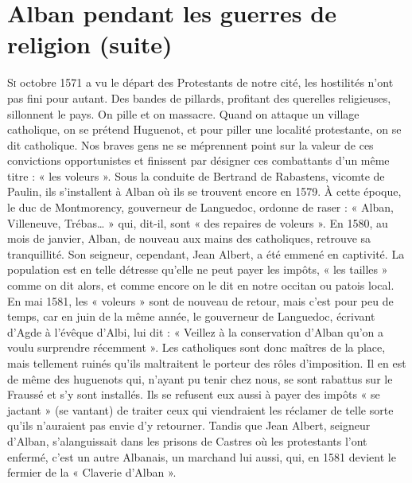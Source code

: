 
\section*{Alban pendant les guerres de religion (suite)}

\lettrine{S}{i} octobre 1571 a vu le départ des Protestants de notre cité, les hostilités n'ont pas fini pour autant. Des bandes de pillards, profitant des querelles religieuses, sillonnent le pays. On pille et on massacre. Quand on attaque un village catholique, on se prétend Huguenot, et pour piller une localité protestante, on se dit catholique. Nos braves gens ne se méprennent point sur la valeur de ces convictions opportunistes et finissent par désigner ces combattants d'un même titre : « les voleurs ». Sous la conduite de Bertrand de Rabastens, vicomte de Paulin, ils s'installent à Alban où ils se trouvent encore en 1579. À cette époque, le duc de Montmorency, gouverneur de Languedoc, ordonne de raser : « Alban, Villeneuve, Trébas… » qui, dit-il, sont « des repaires de voleurs ». En 1580, au mois de janvier, Alban, de nouveau aux mains des catholiques, retrouve sa tranquillité. Son seigneur, cependant, Jean Albert, a été emmené en captivité. La population est en telle détresse qu'elle ne peut payer les impôts, « les tailles » comme on dit alors, et comme encore on le dit en notre occitan ou patois local. En mai 1581, les « voleurs » sont de nouveau de retour, mais c'est pour peu de temps, car en juin de la même année, le gouverneur de Languedoc, écrivant d'Agde à l'évêque d'Albi, lui dit : « Veillez à la conservation d'Alban qu'on a voulu surprendre récemment ». Les catholiques sont donc maîtres de la place, mais tellement ruinés qu'ils maltraitent le porteur des rôles d'imposition. Il en est de même des huguenots qui, n'ayant pu tenir chez nous, se sont rabattus sur le Fraussé et s'y sont installés. Ils se refusent eux aussi à payer des impôts « se jactant » (se vantant) de traiter ceux qui viendraient les réclamer de telle sorte qu'ils n'auraient pas envie d'y retourner. Tandis que Jean Albert, seigneur d'Alban, s'alanguissait dans les prisons de Castres où les protestants l'ont enfermé, c'est un autre Albanais, un marchand lui aussi, qui, en 1581 devient le fermier de la « Claverie d'Alban ».

